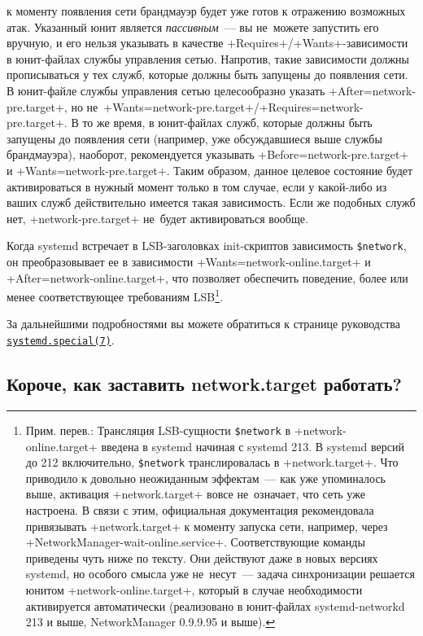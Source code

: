 \documentclass[10pt,oneside,a4paper]{article}
\newcommand{\hreftt}[2]{\href{#1}{\texttt{#2}}}
\begin{document}
\begin{itemize}
		к моменту появления сети брандмауэр будет уже готов к отражению
		возможных атак. Указанный юнит является \emph{пассивным}~--- вы
		не~можете запустить его вручную, и его нельзя указывать в
		качестве +Requires+/+Wants+-зависимости в юнит-файлах службы
		управления сетью. Напротив, такие зависимости должны
		прописываться у тех служб, которые должны быть запущены до
		появления сети. В юнит-файле службы управления сетью
		целесообразно указать +After=network-pre.target+, но
		не~+Wants=network-pre.target+/+Requires=network-pre.target+. В
		то же время, в юнит-файлах служб, которые должны быть запущены
		до появления сети (например, уже обсуждавшиеся выше службы
		брандмауэра), наоборот, рекомендуется указывать
		+Before=network-pre.target+ и +Wants=network-pre.target+. Таким
		образом, данное целевое состояние будет активироваться в нужный
		момент только в том случае, если у какой-либо из ваших служб
		действительно имеется такая зависимость. Если же подобных служб
		нет, +network-pre.target+ не~будет активироваться вообще.
\end{itemize}

Когда systemd встречает в LSB-заголовках init-скриптов зависимость
\verb+$network+, он преобразовывает ее в зависимости
+Wants=network-online.target+ и +After=network-online.target+, что позволяет
обеспечить поведение, более или менее соответствующее требованиям
LSB\footnote{\label{ftn:lsbnetwork}Прим. перев.: Трансляция LSB-сущности
\verb+$network+ в +network-online.target+ введена в systemd начиная с systemd
213. В systemd версий до 212 включительно, \verb+$network+ транслировалась в
+network.target+. Что приводило к довольно неожиданным эффектам~--- как уже
упоминалось выше, активация +network.target+ вовсе не~означает, что сеть уже
настроена. В связи с этим, официальная документация рекомендовала привязывать
+network.target+ к моменту запуска сети, например, через
+NetworkManager-wait-online.service+. Соответствующие команды приведены чуть
ниже по тексту. Они действуют даже в новых версиях systemd, но особого смысла
уже не~несут~--- задача синхронизации решается юнитом +network-online.target+,
который в случае необходимости активируется автоматически (реализовано в
юнит-файлах systemd-networkd 213 и выше, NetworkManager 0.9.9.95 и выше).}.

За дальнейшими подробностями вы можете обратиться к странице руководства
\hreftt{http://www.freedesktop.org/software/systemd/man/systemd.special.html}{systemd.special(7)}.

\subsection{Короче, как заставить network.target работать?}
\end{document}
